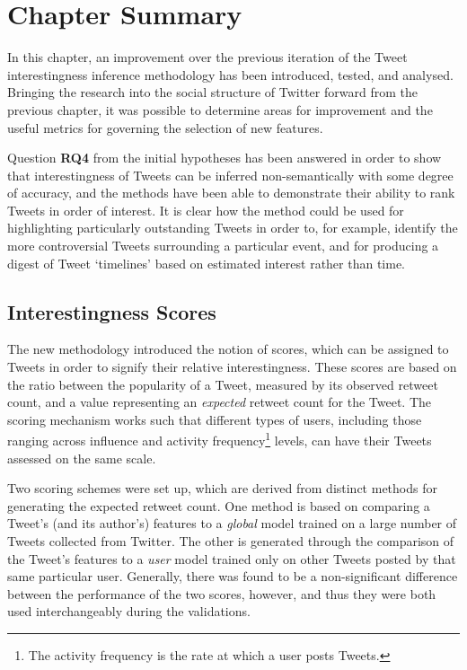 \section{Chapter Summary}
In this chapter, an improvement over the previous iteration of the Tweet interestingness inference methodology has been introduced, tested, and analysed. Bringing the research into the social structure of Twitter forward from the previous chapter, it was possible to determine areas for improvement and the useful metrics for governing the selection of new features. 

Question \textbf{RQ4} from the initial hypotheses has been answered in order to show that interestingness of Tweets can be inferred non-semantically with some degree of accuracy, and the methods have been able to demonstrate their ability to rank Tweets in order of interest. It is clear how the method could be used for highlighting particularly outstanding Tweets in order to, for example, identify the more controversial Tweets surrounding a particular event, and for producing a digest of Tweet `timelines' based on estimated interest rather than time.

\subsection{Interestingness Scores}
The new methodology introduced the notion of scores, which can be assigned to Tweets in order to signify their relative interestingness. These scores are based on the ratio between the popularity of a Tweet, measured by its observed retweet count, and a value representing an \textit{expected} retweet count for the Tweet. The scoring mechanism works such that different types of users, including those ranging across influence and activity frequency\footnote{The activity frequency is the rate at which a user posts Tweets.} levels, can have their Tweets assessed on the same scale. 

Two scoring schemes were set up, which are derived from distinct methods for generating the expected retweet count. One method is based on comparing a Tweet's (and its author's) features to a \textit{global} model trained on a large number of Tweets collected from Twitter. The other is generated through the comparison of the Tweet's features to a \textit{user} model trained only on other Tweets posted by that same particular user. Generally, there was found to be a non-significant difference between the performance of the two scores, however, and thus they were both used interchangeably during the validations.

